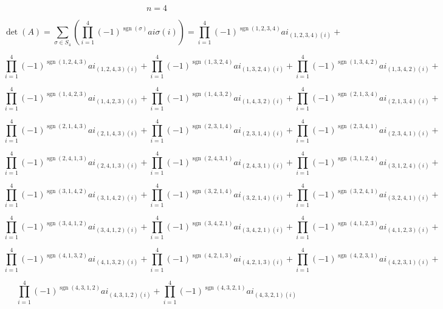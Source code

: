 \documentclass[12pt]{article}
\begin{document}
$$n = 4$$

$$\operatorname{det}(A)=\sum_{\sigma \in S_{4}}  \left(\prod_{i=1}^{4} (-1)^ {\operatorname{sgn}(\sigma)}  ai \sigma (i) \right) = 
\prod_{i=1}^{4} (-1)^ {\operatorname{sgn}(1, 2, 3, 4)}  ai_{(1, 2, 3, 4) (i)} + $$

$$\prod_{i=1}^{4} (-1)^ {\operatorname{sgn}(1, 2, 4, 3)}  ai_{(1, 2, 4, 3) (i)} + \prod_{i=1}^{4} (-1)^ {\operatorname{sgn}(1, 3, 2, 4)}  ai_{(1, 3, 2, 4) (i)} + 
\prod_{i=1}^{4} (-1)^ {\operatorname{sgn}(1, 3, 4, 2)}  ai_{(1, 3, 4, 2) (i)} + $$

$$\prod_{i=1}^{4} (-1)^ {\operatorname{sgn}(1, 4, 2, 3)}  ai_{(1, 4, 2, 3) (i)} + 
\prod_{i=1}^{4} (-1)^ {\operatorname{sgn}(1, 4, 3, 2)}  ai_{(1, 4, 3, 2) (i)} + 
\prod_{i=1}^{4} (-1)^ {\operatorname{sgn}(2, 1, 3, 4)}  ai_{(2, 1, 3, 4) (i)} + $$

$$\prod_{i=1}^{4} (-1)^ {\operatorname{sgn}(2, 1, 4, 3)}  ai_{(2, 1, 4, 3) (i)} + 
\prod_{i=1}^{4} (-1)^ {\operatorname{sgn}(2, 3, 1, 4)}  ai_{(2, 3, 1, 4) (i)} + 
\prod_{i=1}^{4} (-1)^ {\operatorname{sgn}(2, 3, 4, 1)}  ai_{(2, 3, 4, 1) (i)} + $$

$$\prod_{i=1}^{4} (-1)^ {\operatorname{sgn}(2, 4, 1, 3)}  ai_{(2, 4, 1, 3) (i)} + 
\prod_{i=1}^{4} (-1)^ {\operatorname{sgn}(2, 4, 3, 1)}  ai_{(2, 4, 3, 1) (i)} + 
\prod_{i=1}^{4} (-1)^ {\operatorname{sgn}(3, 1, 2, 4)}  ai_{(3, 1, 2, 4) (i)} + $$

$$\prod_{i=1}^{4} (-1)^ {\operatorname{sgn}(3, 1, 4, 2)}  ai_{(3, 1, 4, 2) (i)} + 
\prod_{i=1}^{4} (-1)^ {\operatorname{sgn}(3, 2, 1, 4)}  ai_{(3, 2, 1, 4) (i)} + 
\prod_{i=1}^{4} (-1)^ {\operatorname{sgn}(3, 2, 4, 1)}  ai_{(3, 2, 4, 1) (i)} + $$

$$\prod_{i=1}^{4} (-1)^ {\operatorname{sgn}(3, 4, 1, 2)}  ai_{(3, 4, 1, 2) (i)} + \prod_{i=1}^{4} (-1)^ {\operatorname{sgn}(3, 4, 2, 1)}  ai_{(3, 4, 2, 1) (i)} + 
\prod_{i=1}^{4} (-1)^ {\operatorname{sgn}(4, 1, 2, 3)}  ai_{(4, 1, 2, 3) (i)} + $$

$$\prod_{i=1}^{4} (-1)^ {\operatorname{sgn}(4, 1, 3, 2)}  ai_{(4, 1, 3, 2) (i)} + 
\prod_{i=1}^{4} (-1)^ {\operatorname{sgn}(4, 2, 1, 3)}  ai_{(4, 2, 1, 3) (i)} + 
\prod_{i=1}^{4} (-1)^ {\operatorname{sgn}(4, 2, 3, 1)}  ai_{(4, 2, 3, 1) (i)} + $$

$$\prod_{i=1}^{4} (-1)^ {\operatorname{sgn}(4, 3, 1, 2)}  ai_{(4, 3, 1, 2) (i)} + 
\prod_{i=1}^{4} (-1)^ {\operatorname{sgn}(4, 3, 2, 1)}  ai_{(4, 3, 2, 1) (i)} $$
\newpage
\end{document}
